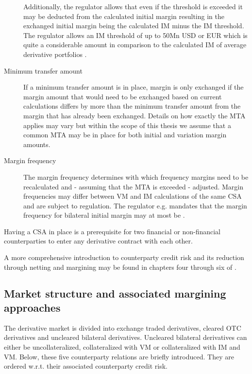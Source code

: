 \documentclass[../Thesis_AHoecherl.tex]{subfiles}
\begin{document}
\begin{description}
    Additionally, the regulator allows that even if the threshold is exceeded it may be deducted from the calculated initial margin resulting in the exchanged initial margin being the calculated \gls{IM} minus the \gls{IM} threshold.
    The regulator allows an IM threshold of up to 50Mn USD or EUR  which is quite a considerable amount in comparison to the calculated IM of average derivative portfolios \cite{ISDAMarginSurvey}.
    \item[Minimum transfer amount]
    If a minimum transfer amount is in place, margin is only exchanged if the margin amount that would need to be exchanged based on current calculations differs by more than the minimum transfer amount from the margin that has already been exchanged.
    Details on how exactly the \gls{MTA} applies may vary but within the scope of this thesis we assume that a common \gls{MTA} may be in place for both initial and variation margin amounts. 
    \item[Margin frequency]
    The margin frequency determines with which frequency margins need to be recalculated and - assuming that the MTA is exceeded - adjusted. Margin frequencies may differ between VM and IM calculations of the same \gls{CSA} and are subject to regulation. The regulator e.g. mandates that the margin frequency for bilateral initial margin may at most be .
\end{description}

Having a CSA in place is a prerequisite for two financial or non-financial counterparties to enter any derivative contract with each other.

A more comprehensive introduction to counterparty credit risk and its reduction through netting and margining may be found in chapters four through six of \cite{gregory2015xva}.

\subsection{Market structure and associated margining approaches}\label{sec:Market strucutre and associated margining approaches}

The derivative market is divided into exchange traded derivatives, cleared OTC derivatives and uncleared bilateral derivatives. Uncleared bilateral derivatives can either be uncollateralized, collateralized with \gls{VM} or collateralized with \gls{IM} and \gls{VM}. Below, these five counterparty relations are briefly introduced. They are ordered w.r.t. their associated counterparty credit risk.
\end{document}

